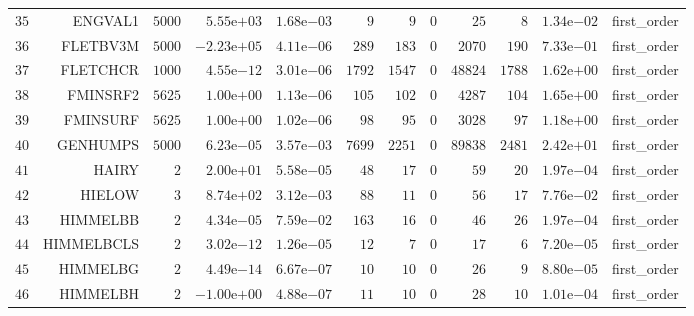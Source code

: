 \begin{longtable}{rrrrrrrrrrrr}
  \(    35\) & ENGVAL1 & \(  5000\) & \( 5.55\)e\(+03\) & \( 1.68\)e\(-03\) & \(     9\) & \(     9\) & \(     0\) & \(    25\) & \(     8\) & \( 1.34\)e\(-02\) & first\_order \\
  \(    36\) & FLETBV3M & \(  5000\) & \(-2.23\)e\(+05\) & \( 4.11\)e\(-06\) & \(   289\) & \(   183\) & \(     0\) & \(  2070\) & \(   190\) & \( 7.33\)e\(-01\) & first\_order \\
  \(    37\) & FLETCHCR & \(  1000\) & \( 4.55\)e\(-12\) & \( 3.01\)e\(-06\) & \(  1792\) & \(  1547\) & \(     0\) & \( 48824\) & \(  1788\) & \( 1.62\)e\(+00\) & first\_order \\
  \(    38\) & FMINSRF2 & \(  5625\) & \( 1.00\)e\(+00\) & \( 1.13\)e\(-06\) & \(   105\) & \(   102\) & \(     0\) & \(  4287\) & \(   104\) & \( 1.65\)e\(+00\) & first\_order \\
  \(    39\) & FMINSURF & \(  5625\) & \( 1.00\)e\(+00\) & \( 1.02\)e\(-06\) & \(    98\) & \(    95\) & \(     0\) & \(  3028\) & \(    97\) & \( 1.18\)e\(+00\) & first\_order \\
  \(    40\) & GENHUMPS & \(  5000\) & \( 6.23\)e\(-05\) & \( 3.57\)e\(-03\) & \(  7699\) & \(  2251\) & \(     0\) & \( 89838\) & \(  2481\) & \( 2.42\)e\(+01\) & first\_order \\
  \(    41\) & HAIRY & \(     2\) & \( 2.00\)e\(+01\) & \( 5.58\)e\(-05\) & \(    48\) & \(    17\) & \(     0\) & \(    59\) & \(    20\) & \( 1.97\)e\(-04\) & first\_order \\
  \(    42\) & HIELOW & \(     3\) & \( 8.74\)e\(+02\) & \( 3.12\)e\(-03\) & \(    88\) & \(    11\) & \(     0\) & \(    56\) & \(    17\) & \( 7.76\)e\(-02\) & first\_order \\
  \(    43\) & HIMMELBB & \(     2\) & \( 4.34\)e\(-05\) & \( 7.59\)e\(-02\) & \(   163\) & \(    16\) & \(     0\) & \(    46\) & \(    26\) & \( 1.97\)e\(-04\) & first\_order \\
  \(    44\) & HIMMELBCLS & \(     2\) & \( 3.02\)e\(-12\) & \( 1.26\)e\(-05\) & \(    12\) & \(     7\) & \(     0\) & \(    17\) & \(     6\) & \( 7.20\)e\(-05\) & first\_order \\
  \(    45\) & HIMMELBG & \(     2\) & \( 4.49\)e\(-14\) & \( 6.67\)e\(-07\) & \(    10\) & \(    10\) & \(     0\) & \(    26\) & \(     9\) & \( 8.80\)e\(-05\) & first\_order \\
  \(    46\) & HIMMELBH & \(     2\) & \(-1.00\)e\(+00\) & \( 4.88\)e\(-07\) & \(    11\) & \(    10\) & \(     0\) & \(    28\) & \(    10\) & \( 1.01\)e\(-04\) & first\_order \\

\end{longtable}

